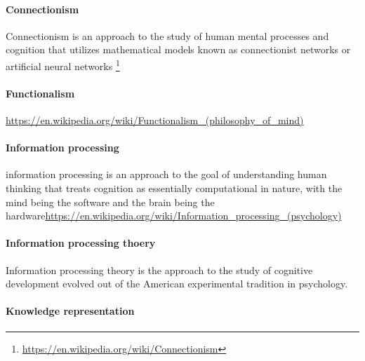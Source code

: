 \documentclass{book}
\providecommand{\seeherefooter}[1]{\footnote{\url{#1}}}
\begin{document}
\paragraph{Connectionism}


Connectionism is an approach to the study of human mental processes and cognition that utilizes mathematical models known as connectionist networks or artificial neural networks \seeherefooter{https://en.wikipedia.org/wiki/Connectionism}

\paragraph{Functionalism}


\url{https://en.wikipedia.org/wiki/Functionalism_(philosophy_of_mind)}

\paragraph{Information processing}


information processing is an approach to the goal of understanding human thinking that treats cognition as essentially computational in nature, with the mind being the software and the brain being the hardware\url{https://en.wikipedia.org/wiki/Information_processing_(psychology)}

\paragraph{Information processing thoery}


Information processing theory is the approach to the study of cognitive development evolved out of the American experimental tradition in psychology.

\paragraph{Knowledge representation}

\end{document}
